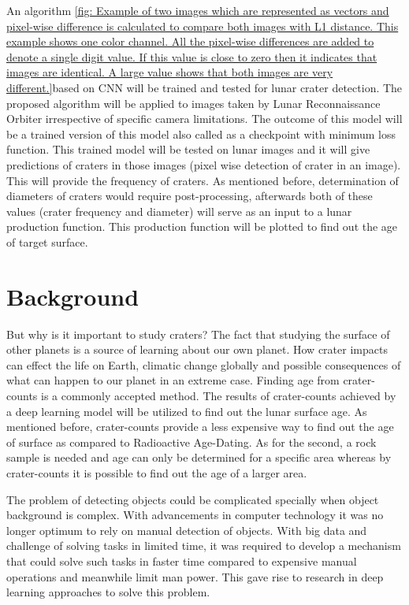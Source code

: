 \documentclass[11pt]{article}
\begin{document}
An algorithm \ref{fig: Example of two images which are represented as vectors and pixel-wise difference is calculated to compare both images with L1 distance. This example shows one color channel. All the pixel-wise differences are added to denote a single digit value. If this value is close to zero then it indicates that images are identical. A large value shows that both images are very different.}based on CNN will be trained and tested for lunar crater detection. The proposed algorithm will be applied to images taken by Lunar Reconnaissance Orbiter irrespective of specific camera limitations. The outcome of this model will be a trained version of this model also called as a checkpoint with minimum loss function. This trained model will be tested on lunar images and it will give predictions of craters in those images (pixel wise detection of crater in an image). This will provide the frequency of craters. As mentioned before, determination of diameters of craters would require post-processing, afterwards both of these values (crater frequency and diameter) will serve as an input to a lunar production function. This production function will be plotted to find out the age of target surface.


\section{Background}
But why is it important to study craters? The fact that studying the surface of other planets is a source of learning about our own planet. How crater impacts can effect the life on Earth, climatic change globally and possible consequences of what can happen to our planet in an extreme case. Finding age from crater-counts is a commonly accepted method. The results of crater-counts achieved by a deep learning model will be utilized to find out the lunar surface age. As mentioned before, crater-counts provide a less expensive way to find out the age of surface as compared to Radioactive Age-Dating. As for the second, a rock sample is needed and age can only be determined for a specific area whereas by crater-counts it is possible to find out the age of a larger area.

The problem of detecting objects could be complicated specially when object background is complex. With advancements in computer technology it was no longer optimum to rely on manual detection of objects. With big data and challenge of solving tasks in limited time, it was required to develop a mechanism that could solve such tasks in faster time compared to expensive manual operations and meanwhile limit man power. This gave rise to research in deep learning approaches to solve this problem.
\end{document}
